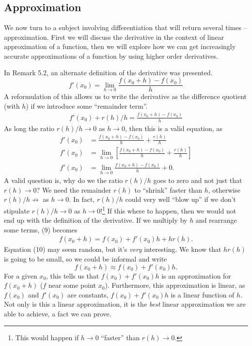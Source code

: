 \documentclass{article}
\theoremstyle{definition}
\begin{document}
\subsection{Approximation}
We now turn to a subject involving differentiation that will return several times -- approximation. First we will discuss the derivative in the context of linear approximation of a function, then we will explore how we can get increasingly accurate approximations of a function by using higher order derivatives.

In Remark 5.2, an alternate definition of the derivative was presented. $$f'(x_0)=\lim\limits_{h\to 0}\frac{f(x_0+h)-f(x_0)}{h}$$ A reformulation of this allows us to write the derivative as the difference quotient (with $ h $) if we introduce some ``remainder term''. 
\begin{align}
f'(x_0)+r(h)/h=\frac{f(x_0+h)-f(x_0)}{h}
\end{align}
As long the ratio $ r(h)/h\to 0 $ as $ h\to 0 $, then this is a valid equation, as \begin{align*}
	f'(x_0)&=\frac{f(x_0+h)-f(x_0)}{h}+\frac{r(h)}{h}\\
	f'(x_0)&= \lim\limits_{h\to 0}\left[\frac{f(x_0+h)-f(x_0)}{h} + \frac{r(h)}{h}\right]\\
	f'(x_0)&= \lim\limits_{h\to 0}\frac{f(x_0+h)-f(x_0)}{h}+0.
\end{align*}
A valid question is, why do we the ratio $ r(h)/h $ goes to zero and not just that $ r(h)\to 0 $? We need the remainder $ r(h) $ to ``shrink'' faster than $ h $, otherwise $ r(h)/h\not\to $ as $ h\to 0 $. In fact, $ r(h)/h $ could very well ``blow up'' if we don't stipulate $ r(h)/h\to 0 $ as $ h\to 0 $!\footnote{This would happen if $ h\to 0 $ ``faster'' than $ r(h)\to 0 $.} If this where to happen, then we would not end up with the definition of the derivative. If we multiply by $ h $ and rearrange some terms, (9) becomes 
\begin{align}
	f(x_0+h)=f(x_0)+f'(x_0)h+hr(h).
\end{align}
Equation (10) may seem random, but it's \textit{very} interesting. We know that $ hr(h) $ is going to be small, so we could be informal and write $$ f(x_0+h)\approx f(x_0)+f'(x_0)h. $$ For a given $ x_0 $, this tells us that $ f(x_0)+f'(x_0)h $ is an approximation for $ f(x_0+h) $ ($ f $ near some point $ x_0 $). Furthermore, this approximation is linear, as $ f(x_0) $ and $ f'(x_0) $ are constants, $ f(x_0)+f'(x_0)h $ is a linear function of $ h $. Not only is this a linear approximation, it is the \textit{best} linear approximation we are able to achieve, a fact we can prove.
\end{document}
